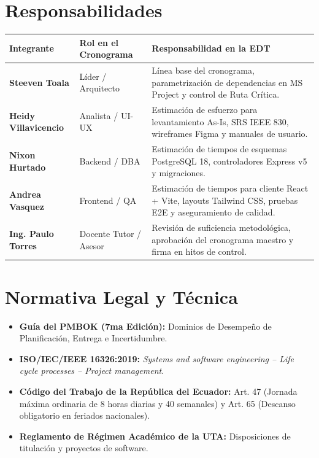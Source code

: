 \documentclass[12pt,a4paper]{article}
\begin{document}
\section{Responsabilidades}
\begin{table}[h!]
\centering
\small
\renewcommand{\arraystretch}{1.15}
\begin{tabularx}{\textwidth}{|>{\bfseries}p{3.5cm}|p{3.2cm}|X|}
\hline
\rowcolor{tableheader}
Integrante & Rol en el Cronograma & Responsabilidad en la EDT \\
\hline
Steeven Toala & Líder / Arquitecto & Línea base del cronograma, parametrización de dependencias en MS Project y control de Ruta Crítica. \\
\hline
Heidy Villavicencio & Analista / UI-UX & Estimación de esfuerzo para levantamiento As-Is, SRS IEEE 830, wireframes Figma y manuales de usuario. \\
\hline
Nixon Hurtado & Backend / DBA & Estimación de tiempos de esquemas PostgreSQL 18, controladores Express v5 y migraciones. \\
\hline
Andrea Vasquez & Frontend / QA & Estimación de tiempos para cliente React + Vite, layouts Tailwind CSS, pruebas E2E y aseguramiento de calidad. \\
\hline
Ing. Paulo Torres & Docente Tutor / Asesor & Revisión de suficiencia metodológica, aprobación del cronograma maestro y firma en hitos de control. \\
\hline
\end{tabularx}
\end{table}

\section{Normativa Legal y Técnica}
\begin{itemize}[leftmargin=1.5em, itemsep=2pt, topsep=2pt]
    \item \textbf{Guía del PMBOK (7ma Edición):} Dominios de Desempeño de Planificación, Entrega e Incertidumbre.
    \item \textbf{ISO/IEC/IEEE 16326:2019:} \textit{Systems and software engineering -- Life cycle processes -- Project management}.
    \item \textbf{Código del Trabajo de la República del Ecuador:} Art. 47 (Jornada máxima ordinaria de 8 horas diarias y 40 semanales) y Art. 65 (Descanso obligatorio en feriados nacionales).
    \item \textbf{Reglamento de Régimen Académico de la UTA:} Disposiciones de titulación y proyectos de software.
\end{itemize}
\end{document}
